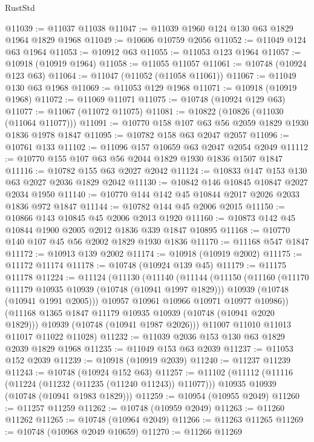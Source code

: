 \begin{lexlean}{RustStd}
\begin{coremodule}
@11039 := @11037 @11038
@11047 := @11039 @1960 @124 @130 @63 @1829 @1964 @1829 @1968
@11049 := @10606 @10759 @2056
@11052 := @11049 @124 @63 @1964
@11053 := @10912 @63
@11055 := @11053 @123 @1964
@11057 := @10918 (@10919 @1964)
@11058 := @11055 @11057
@11061 := @10748 (@10924 @123 @63)
@11064 := @11047 (@11052 (@11058 @11061))
@11067 := @11049 @130 @63 @1968
@11069 := @11053 @129 @1968
@11071 := @10918 (@10919 @1968)
@11072 := @11069 @11071
@11075 := @10748 (@10924 @129 @63)
@11077 := @11067 (@11072 @11075)
@11081 := @10822 (@10826 (@11030 (@11064 @11077)))
@11091 := @10770 @158 @107 @63 @56 @2059 @1829 @1930 @1836 @1978 @1847
@11095 := @10782 @158 @63 @2047 @2057
@11096 := @10761 @133
@11102 := @11096 @157 @10659 @63 @2047 @2054 @2049
@11112 := @10770 @155 @107 @63 @56 @2044 @1829 @1930 @1836 @1507 @1847
@11116 := @10782 @155 @63 @2027 @2042
@11124 := @10833 @147 @153 @130 @63 @2027 @2036 @1829 @2042
@11130 := @10842 @146 @10845 @10847 @2027 @2034 @1950
@11140 := @10770 @144 @142 @45 @10844 @2017 @2026 @2033 @1836 @972 @1847
@11144 := @10782 @144 @45 @2006 @2015
@11150 := @10866 @143 @10845 @45 @2006 @2013 @1920
@11160 := @10873 @142 @45 @10844 @1900 @2005 @2012 @1836 @339 @1847 @10895
@11168 := @10770 @140 @107 @45 @56 @2002 @1829 @1930 @1836
@11170 := @11168 @547 @1847
@11172 := @10913 @139 @2002
@11174 := @10918 (@10919 @2002)
@11175 := @11172 @11174
@11178 := @10748 (@10924 @139 @45)
@11179 := @11175 @11178
@11224 := @11124
    (@11130
      (@11140
        (@11144
          (@11150
            (@11160
              (@11170 @11179 @10935 @10939 (@10748 (@10941 @1997 @1829)))
              @10939
              (@10748 (@10941 @1991 @2005)))
            @10957
            @10961
            @10966
            @10971
            @10977
            @10986))
        (@11168 @1365 @1847 @11179 @10935 @10939 (@10748 (@10941 @2020 @1829)))
        @10939
        (@10748 (@10941 @1987 @2026)))
      @11007
      @11010
      @11013
      @11017
      @11022
      @11028)
@11232 := @11039 @2036 @153 @130 @63 @1829 @2039 @1829 @1968
@11235 := @11049 @153 @63 @2039
@11237 := @11053 @152 @2039
@11239 := @10918 (@10919 @2039)
@11240 := @11237 @11239
@11243 := @10748 (@10924 @152 @63)
@11257 := @11102
    (@11112
      (@11116 (@11224 (@11232 (@11235 (@11240 @11243)) @11077)))
      @10935
      @10939
      (@10748 (@10941 @1983 @1829)))
@11259 := @10954 (@10955 @2049)
@11260 := @11257 @11259
@11262 := @10748 (@10959 @2049)
@11263 := @11260 @11262
@11265 := @10748 (@10964 @2049)
@11266 := @11263 @11265
@11269 := @10748 (@10968 @2049 @10659)
@11270 := @11266 @11269

\end{coremodule}
\end{lexlean}
